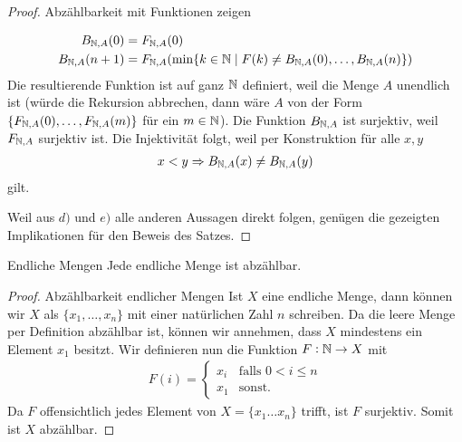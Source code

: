 \begin{proof}{Abzählbarkeit mit Funktionen zeigen}
\begin{itemize}
        \begin{align*}
        B_{\mathbb{N},A}(0) &= F_{\mathbb{N},A}(0)\\
        B_{\mathbb{N},A}(n+1) &= F_{\mathbb{N},A}(\min\{k\in\mathbb{N}\mid F(k)\neq B_{\mathbb{N},A}(0),\dots,B_{\mathbb{N},A}(n) \})
        \end{align*}
        Die resultierende Funktion ist auf ganz $\mathbb{N}$ definiert, weil die Menge $A$ unendlich ist (würde die Rekursion abbrechen, dann wäre $A$ von der Form $\{F_{\mathbb{N},A}(0),\dots,F_{\mathbb{N},A}(m)\}$ für ein $m\in\mathbb{N}$). Die Funktion $B_{\mathbb{N},A}$ ist surjektiv, weil $F_{\mathbb{N},A}$ surjektiv ist. Die Injektivität folgt, weil per Konstruktion für alle $x,y$
        \begin{align*}
        x<y \Rightarrow B_{\mathbb{N},A}(x) \neq B_{\mathbb{N},A}(y)
        \end{align*}
        gilt.
    \end{itemize}
    Weil aus $d)$ und $e)$ alle anderen Aussagen direkt folgen, genügen die gezeigten Implikationen für den Beweis des Satzes.
\end{proof}



\begin{lemma}{Endliche Mengen}
Jede endliche Menge ist abzählbar.
\end{lemma}

\begin{proof}{Abzählbarkeit endlicher Mengen}
Ist $X$ eine endliche Menge, dann können wir $X$ als $\{x_1,\dots,x_n\}$ mit einer natürlichen Zahl $n$ schreiben. Da die leere Menge per Definition abzählbar ist, können wir annehmen, dass $X$ mindestens ein Element $x_1$ besitzt. Wir definieren nun die Funktion $F:\mathbb{N}\to X$ mit
\begin{align*}
F(i)=\begin{cases}
x_i&\text{falls }0<i\leq n\\
x_1&\text{sonst.}
\end{cases}
\end{align*}
Da $F$ offensichtlich jedes Element von $X=\{x_1\dots x_n\}$ trifft, ist $F$ surjektiv. Somit ist $X$ abzählbar.
\end{proof}

